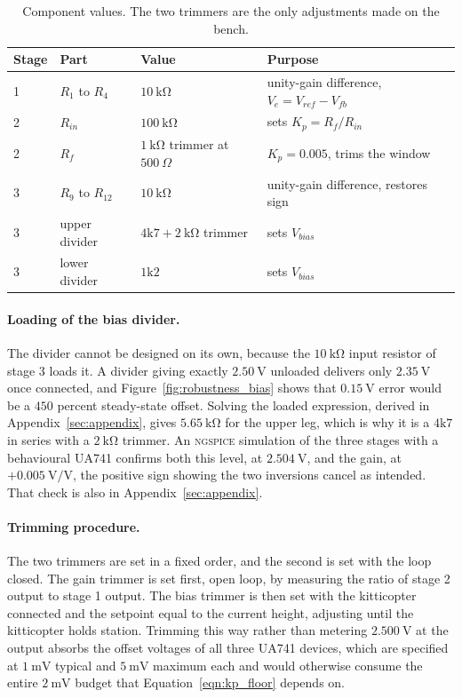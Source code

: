 \begin{table}[htbp]
\centering
\caption{Component values. The two trimmers are the only adjustments made on the bench.}
\label{tab:bom}
\begin{tabular}{llll}
\toprule
Stage & Part & Value & Purpose \\
\midrule
1 & $R_1$ to $R_4$ & $10\ \mathrm{k\Omega}$ & unity-gain difference, $V_e = V_{ref} - V_{fb}$ \\
2 & $R_{in}$ & $100\ \mathrm{k\Omega}$ & sets $K_p = R_f/R_{in}$ \\
2 & $R_f$ & $1\ \mathrm{k\Omega}$ trimmer at $500\ \Omega$ & $K_p = 0.005$, trims the window \\
3 & $R_9$ to $R_{12}$ & $10\ \mathrm{k\Omega}$ & unity-gain difference, restores sign \\
3 & upper divider & $4\mathrm{k}7 + 2\ \mathrm{k\Omega}$ trimmer & sets $V_{bias}$ \\
3 & lower divider & $1\mathrm{k}2$ & sets $V_{bias}$ \\
\bottomrule
\end{tabular}
\end{table}

\paragraph{Loading of the bias divider.} The divider cannot be designed on its own, because the
$10\ \mathrm{k\Omega}$ input resistor of stage 3 loads it. A divider giving exactly
$2.50\ \mathrm{V}$ unloaded delivers only $2.35\ \mathrm{V}$ once connected, and
Figure~\ref{fig:robustness_bias} shows that $0.15\ \mathrm{V}$ error would be a $450$ percent
steady-state offset. Solving the loaded expression, derived in Appendix~\ref{sec:appendix}, gives
$5.65\ \mathrm{k\Omega}$ for the upper leg, which is why it is a $4\mathrm{k}7$ in series with a
$2\ \mathrm{k\Omega}$ trimmer. An \textsc{ngspice} simulation of the three stages with a
behavioural UA741 confirms both this level, at $2.504\ \mathrm{V}$, and the gain, at
$+0.005\ \mathrm{V/V}$, the positive sign showing the two inversions cancel as intended. That
check is also in Appendix~\ref{sec:appendix}.

\paragraph{Trimming procedure.} The two trimmers are set in a fixed order, and the second is set
with the loop closed. The gain trimmer is set first, open loop, by measuring the ratio of stage 2
output to stage 1 output. The bias trimmer is then set with the kitticopter connected and the
setpoint equal to the current height, adjusting until the kitticopter holds station. Trimming this
way rather than metering $2.500\ \mathrm{V}$ at the output absorbs the offset voltages of all
three UA741 devices, which are specified at $1\ \mathrm{mV}$ typical and $5\ \mathrm{mV}$ maximum
each and would otherwise consume the entire $2\ \mathrm{mV}$ budget that
Equation~\eqref{eqn:kp_floor} depends on.

